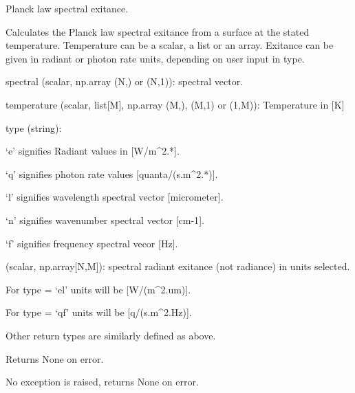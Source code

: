 \documentclass[a4paper,10pt,english]{sphinxmanual}
\begin{document}
\begin{fulllineitems}
\label{ryplanck:pyradi.ryplanck.planck}
Planck law spectral exitance.

Calculates the Planck law spectral exitance from a surface at the stated 
temperature. Temperature can be a scalar, a list or an array. Exitance can 
be given in radiant or photon rate units, depending on user input in type.
\begin{description}
\item[{Args:}] \leavevmode
\begin{DUlineblock}{0em}
\item[] spectral (scalar, np.array (N,) or (N,1)):  spectral vector.
\item[] temperature (scalar, list{[}M{]}, np.array (M,), (M,1) or (1,M)):  Temperature in {[}K{]}
\item[] type (string):
\item[]
\begin{DUlineblock}{\DUlineblockindent}
\item[] `e' signifies Radiant values in {[}W/m\textasciicircum{}2.*{]}.
\item[] `q' signifies photon rate values  {[}quanta/(s.m\textasciicircum{}2.*){]}.
\item[] `l' signifies wavelength spectral vector  {[}micrometer{]}.
\item[] `n' signifies wavenumber spectral vector {[}cm-1{]}.
\item[] `f' signifies frequency spectral vecor {[}Hz{]}.
\end{DUlineblock}
\end{DUlineblock}

\item[{Returns:}] \leavevmode
\begin{DUlineblock}{0em}
\item[] (scalar, np.array{[}N,M{]}):  spectral radiant exitance (not radiance) in units selected.
\item[] For type = `el' units will be {[}W/(m\textasciicircum{}2.um){]}.
\item[] For type = `qf' units will be {[}q/(s.m\textasciicircum{}2.Hz){]}.
\item[] Other return types are similarly defined as above.
\item[] Returns None on error.
\end{DUlineblock}

\item[{Raises:}] \leavevmode
\begin{DUlineblock}{0em}
\item[] No exception is raised, returns None on error.
\end{DUlineblock}

\end{description}

\end{fulllineitems}
\end{document}
